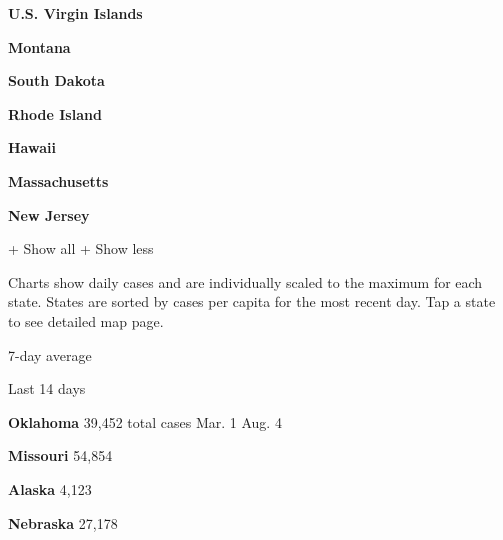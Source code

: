 \textbf{U.S. Virgin Islands}

\href{https://www.nytimes3xbfgragh.onion/interactive/2020/us/montana-coronavirus-cases.html}{}

\textbf{Montana}

\href{https://www.nytimes3xbfgragh.onion/interactive/2020/us/south-dakota-coronavirus-cases.html}{}

\textbf{South Dakota}

\href{https://www.nytimes3xbfgragh.onion/interactive/2020/us/rhode-island-coronavirus-cases.html}{}

\textbf{Rhode Island}

\href{https://www.nytimes3xbfgragh.onion/interactive/2020/us/hawaii-coronavirus-cases.html}{}

\textbf{Hawaii}

\href{https://www.nytimes3xbfgragh.onion/interactive/2020/us/massachusetts-coronavirus-cases.html}{}

\textbf{Massachusetts}

\href{https://www.nytimes3xbfgragh.onion/interactive/2020/us/new-jersey-coronavirus-cases.html}{}

\textbf{New Jersey}

+ Show all + Show less

Charts show daily cases and are individually scaled to the maximum for
each state. States are sorted by cases per capita for the most recent
day. Tap a state to see detailed map page.

\href{https://www.nytimes3xbfgragh.onion/interactive/2020/us/oklahoma-coronavirus-cases.html}{}

7-day average

Last 14 days

\textbf{Oklahoma} 39,452 total cases Mar. 1 Aug. 4

\href{https://www.nytimes3xbfgragh.onion/interactive/2020/us/missouri-coronavirus-cases.html}{}

\textbf{Missouri} 54,854

\href{https://www.nytimes3xbfgragh.onion/interactive/2020/us/alaska-coronavirus-cases.html}{}

\textbf{Alaska} 4,123

\href{https://www.nytimes3xbfgragh.onion/interactive/2020/us/nebraska-coronavirus-cases.html}{}

\textbf{Nebraska} 27,178

\href{https://www.nytimes3xbfgragh.onion/interactive/2020/us/maryland-coronavirus-cases.html}{}

